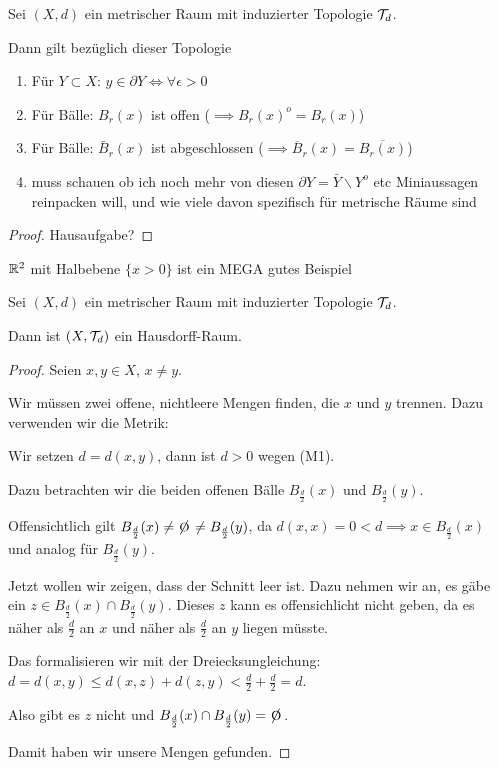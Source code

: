 \begin{lemma}
    Sei $(X, d)$ ein metrischer Raum mit induzierter Topologie $\mathcal{T}_d$.

    Dann gilt bezüglich dieser Topologie
    \begin{enumerate}
        \item Für $Y \subset X$: $y \in \partial Y \iff \forall \epsilon > 0$
        \item Für Bälle: $B_r(x)$ ist offen ($\implies B_r(x)^o = B_r(x)$)
        \item Für Bälle: $\bar{B}_r(x)$ ist abgeschlossen ($\implies \overline{B}_r(x) = \overline{B_r(x)}$)
        \item muss schauen ob ich noch mehr von diesen $\partial Y = \bar{Y} \backslash Y^o$ etc Miniaussagen reinpacken will, und wie viele davon spezifisch für metrische Räume sind
    \end{enumerate}
\end{lemma}
\begin{proof}
    Hausaufgabe?
\end{proof}

\begin{example}
    $\mathbb{R}^2$ mit Halbebene $\{x > 0\}$ ist ein MEGA gutes Beispiel
\end{example}

\begin{lemma}
    Sei $(X, d)$ ein metrischer Raum mit induzierter Topologie $\mathcal{T}_d$.

    Dann ist $(X, \mathcal{T}_d)$ ein Hausdorff-Raum.
\end{lemma}
\begin{proof}
    Seien $x, y \in X$, $x \neq y$.

    Wir müssen zwei offene, nichtleere Mengen finden, die $x$ und $y$ trennen. Dazu verwenden wir die Metrik:

    Wir setzen $d = d(x,y)$, dann ist $d > 0$ wegen (M1).

    Dazu betrachten wir die beiden offenen Bälle $B_{\frac{d}{2}}(x)$ und $B_{\frac{d}{2}}(y)$.

    Offensichtlich gilt $B_{\frac{d}{2}}(x) \neq \e \neq B_{\frac{d}{2}}(y)$, da $d(x, x) = 0 < d \implies x \in B_{\frac{d}{2}}(x)$ und analog für $B_{\frac{d}{2}}(y)$.

    Jetzt wollen wir zeigen, dass der Schnitt leer ist. Dazu nehmen wir an, es gäbe ein $z \in B_{\frac{d}{2}}(x) \cap B_{\frac{d}{2}}(y)$. Dieses $z$ kann es offensichlicht nicht geben, da es näher als $\frac{d}{2}$ an $x$ und näher als $\frac{d}{2}$ an $y$ liegen müsste.
    
    Das formalisieren wir mit der Dreiecksungleichung: $d = d(x, y) \leq d(x, z) + d(z, y) < \frac{d}{2} + \frac{d}{2} = d$.\absurdum

    Also gibt es $z$ nicht und $B_{\frac{d}{2}}(x) \cap B_{\frac{d}{2}}(y) = \e$.

    Damit haben wir unsere Mengen gefunden.
\end{proof}

